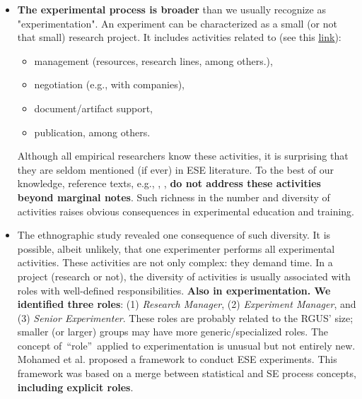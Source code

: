 \begin{itemize}
	\item \textbf{The experimental process is broader} than we usually recognize as "experimentation". An experiment can be characterized as a small (or not that small) research project. It includes activities related to (see this \href{https://zenodo.org/record/7105096#.YyxsxezMLUJ}{\ul{link}}):
		\begin{itemize}
			\item management (resources, research lines, among others.),
			\item negotiation (e.g., with companies), 
			\item document/artifact support, 
			\item publication, among others.
		\end{itemize}
Although all empirical researchers know these activities, it is surprising that they are seldom mentioned (if ever) in ESE literature. To the best of our knowledge, reference texts, e.g., \cite{Wohlin-2000-Experimentation-SE}, \cite{Juristo-2001-SE-experimentation}, \textbf{do not address these activities beyond marginal notes}. Such richness in the number and diversity of activities raises obvious consequences in experimental education and training.
	\item The ethnographic study revealed one consequence of such diversity. It is possible, albeit unlikely, that one experimenter performs all experimental activities. These activities are not only complex: they demand time. In a project (research or not), the diversity of activities is usually associated with roles with well-defined responsibilities. \textbf{Also in experimentation. We identified three roles}: (1) \textit{Research Manager}, (2) \textit{Experiment Manager}, and (3) \textit{Senior Experimenter}. These roles are probably related to the RGUS' size; smaller (or larger) groups may have more generic/specialized roles. The concept of~\textquotedblleft role\textquotedblright~applied to experimentation is unusual but not entirely new. Mohamed et al. \cite{Mohamed-1993-roles-ESE} proposed a framework to conduct ESE experiments. This framework was based on a merge between statistical and SE process concepts, \textbf{including explicit roles}.

\end{itemize}
